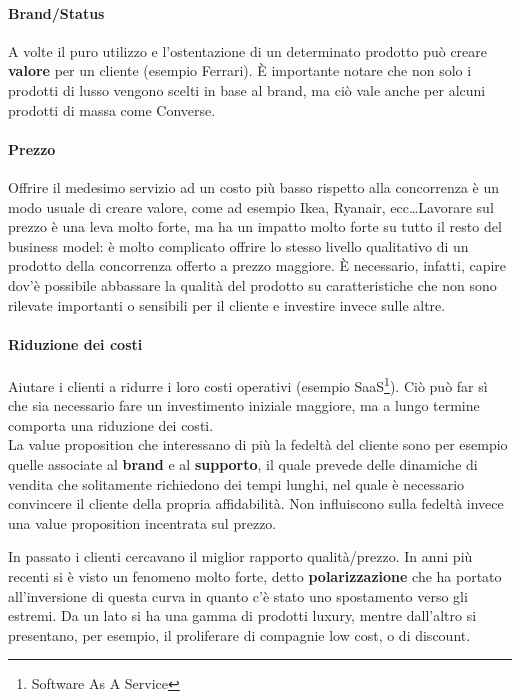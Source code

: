 \paragraph*{Brand/Status} A volte il puro utilizzo e l'ostentazione di un
determinato prodotto può creare \textbf{valore} per un cliente (esempio
Ferrari). È importante notare che non solo i prodotti di lusso vengono scelti
in base al brand, ma ciò vale anche per alcuni prodotti di massa come Converse.

\paragraph*{Prezzo} Offrire il medesimo servizio ad un costo più basso rispetto
alla concorrenza è un modo usuale di creare valore, come ad esempio Ikea,
Ryanair, ecc\dots Lavorare sul prezzo è una leva molto forte, ma ha un impatto
molto forte su tutto il resto del business model: è molto complicato offrire lo
stesso livello qualitativo di un prodotto della concorrenza offerto a prezzo
maggiore. È necessario, infatti, capire dov'è possibile abbassare la qualità
del prodotto su caratteristiche che non sono rilevate importanti o sensibili
per il cliente e investire invece sulle altre.

\paragraph*{Riduzione dei costi} Aiutare i clienti a ridurre i loro costi
operativi (esempio SaaS\footnote{Software As A Service}). Ciò può far sì che
sia necessario fare un investimento iniziale maggiore, ma a lungo termine
comporta una riduzione dei costi.\\[0.3cm]

La value proposition che interessano di più la fedeltà del cliente sono per
esempio quelle associate al \textbf{brand} e al \textbf{supporto}, il quale
prevede delle dinamiche di vendita che solitamente richiedono dei tempi lunghi,
nel quale è necessario convincere il cliente della propria affidabilità. Non
influiscono sulla fedeltà invece una value proposition incentrata sul prezzo.

\noindent In passato i clienti cercavano il miglior rapporto qualità/prezzo. In
anni più recenti si è visto un fenomeno molto forte, detto
\textbf{polarizzazione} che ha portato all'inversione di questa curva
 in quanto c'è stato uno spostamento verso
gli estremi. Da un lato si ha una gamma di prodotti luxury, mentre dall'altro
si presentano, per esempio, il proliferare di compagnie low cost, o di discount.

